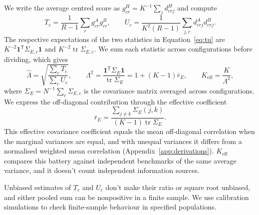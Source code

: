 \documentclass{article}
\newcommand{\Lam}{\Lambda}
\newcommand{\Sig}{\Sigma_E}
\begin{document}
We write the average centred score as $g^H_{cr}=K^{-1}\sum_j d^H_{crj}$ and compute
\begin{equation}
T_c=\frac{1}{R-1}\sum_r g^A_{cr}g^B_{cr},\qquad
U_c=\frac{1}{K^2(R-1)}\sum_{j,r}d^A_{crj}d^B_{crj}.
\label{eq:tu}
\end{equation}
The respective expectations of the two statistics in Equation~\ref{eq:tu} are $K^{-2}\mathbf{1}^{\mathsf T}\Sigma_{E,c}\mathbf{1}$ and $K^{-2}\operatorname{tr}\Sigma_{E,c}$. We sum each statistic across configurations before dividing, which gives
\begin{equation}
\widehat\Lam=\sqrt{\frac{\sum_c T_c}{\sum_c U_c}},\qquad
\Lam^2=\frac{\mathbf{1}^{\mathsf T}\Sig\mathbf{1}}{\operatorname{tr}\Sig}
=1+(K-1)\bar r_E,\qquad K_{\mathrm{eff}}=\frac{K}{\Lam^2},
\label{eq:lambda}
\end{equation}
where $\Sig=N^{-1}\sum_c\Sigma_{E,c}$ is the covariance matrix averaged across configurations. We express the off-diagonal contribution through the effective coefficient
\begin{equation}
\bar r_E=\frac{\sum_{j\ne k}\Sigma_E(j,k)}{(K-1)\operatorname{tr}\Sig}.
\label{eq:effective}
\end{equation}
This effective covariance coefficient equals the mean off-diagonal correlation when the marginal variances are equal, and with unequal variances it differs from a normalised weighted mean correlation (Appendix~\ref{app:derivations}). $K_{\mathrm{eff}}$ compares this battery against independent benchmarks of the same average variance, and it doesn't count independent information sources.

Unbiased estimates of $T_c$ and $U_c$ don't make their ratio or square root unbiased, and either pooled sum can be nonpositive in a finite sample. We use calibration simulations to check finite-sample behaviour in specified populations.
\end{document}
